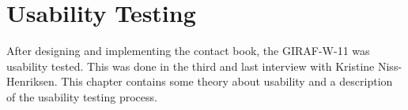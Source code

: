 \chapter{Usability Testing}
After designing and implementing the contact book, the GIRAF-W-11 was usability tested. This was done in the third and last interview with Kristine Niss-Henriksen.
This chapter contains some theory about usability and a description of the usability testing process.

  